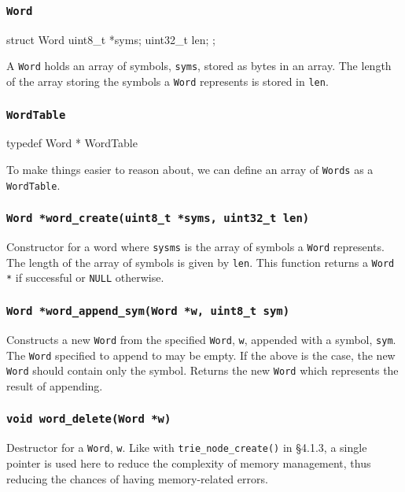 \documentclass{article}
\begin{document}
\subsubsection{\texttt{Word}}
\begin{codelisting}{}
struct Word {
    uint8_t *syms;
    uint32_t len;
};
\end{codelisting}
A \texttt{Word} holds an array of symbols, \texttt{syms}, stored as bytes
in an array. The length of the array storing the symbols a \texttt{Word}
represents is stored in \texttt{len}.

\subsubsection{\texttt{WordTable}}
\begin{codelisting}{}
typedef Word * WordTable
\end{codelisting}

To make things easier to reason about, we can define an array of \texttt{Words}
as a \texttt{WordTable}.

\subsubsection{\texttt{Word *word\_create(uint8\_t *syms, uint32\_t len)}}
Constructor for a word where \texttt{sysms} is the array of symbols
a \texttt{Word} represents. The length of the array of symbols
is given by \texttt{len}. This function returns a \texttt{Word *}
if successful or \texttt{NULL} otherwise.

\subsubsection{\texttt{Word *word\_append\_sym(Word *w, uint8\_t sym)}}
Constructs a new \texttt{Word} from the specified \texttt{Word}, \texttt{w},
appended with a symbol, \texttt{sym}.
The \texttt{Word} specified to append to may be empty.
If the above is the case, the new \texttt{Word} should contain only the symbol.
Returns the new \texttt{Word} which represents the result of appending.

\subsubsection{\texttt{void word\_delete(Word *w)}}
Destructor for a \texttt{Word}, \texttt{w}. Like with
\texttt{trie\_node\_create()} in \S 4.1.3, a single pointer is used
here to reduce the complexity of memory management, thus reducing the
chances of having memory-related errors.
\end{document}
